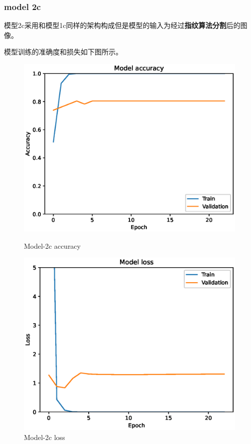 \subsubsection{model 2c}

模型2c采用和模型1c同样的架构构成但是模型的输入为经过\textbf{指纹算法分割}后的图像。

模型训练的准确度和损失如下图所示。

\begin{figure}
    \centering
    \begin{minipage}{0.45\textwidth}
        \centering
        \includegraphics[width=\textwidth]{./fig/model2/accuracy2c.eps}
        \caption{Model-2c accuracy}
        \label{fig:model2c_acc}
    \end{minipage}
    \begin{minipage}{0.45\textwidth}
        \centering
        \includegraphics[width=\textwidth]{./fig/model2/loss2c.eps}
        \caption{Model-2c loss}
        \label{fig:model2c_loss}
    \end{minipage}
\end{figure}



